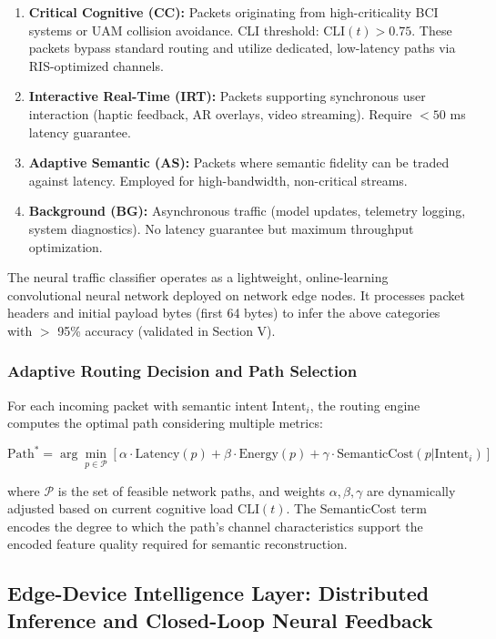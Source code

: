 \documentclass[journal]{IEEEtran}
\begin{document}
\begin{enumerate}
    \item \textbf{Critical Cognitive (CC):} Packets originating from high-criticality BCI systems or UAM collision avoidance. CLI threshold: $\text{CLI}(t) > 0.75$. These packets bypass standard routing and utilize dedicated, low-latency paths via RIS-optimized channels.
    \item \textbf{Interactive Real-Time (IRT):} Packets supporting synchronous user interaction (haptic feedback, AR overlays, video streaming). Require $<50$ ms latency guarantee.
    \item \textbf{Adaptive Semantic (AS):} Packets where semantic fidelity can be traded against latency. Employed for high-bandwidth, non-critical streams.
    \item \textbf{Background (BG):} Asynchronous traffic (model updates, telemetry logging, system diagnostics). No latency guarantee but maximum throughput optimization.
\end{enumerate}

The neural traffic classifier operates as a lightweight, online-learning convolutional neural network deployed on network edge nodes. It processes packet headers and initial payload bytes (first 64 bytes) to infer the above categories with $>$ 95\% accuracy (validated in Section V).

\subsubsection{Adaptive Routing Decision and Path Selection}
For each incoming packet with semantic intent $\text{Intent}_i$, the routing engine computes the optimal path considering multiple metrics:

\begin{equation}
    \text{Path}^* = \arg\min_{p \in \mathcal{P}} \left[ \alpha \cdot \text{Latency}(p) + \beta \cdot \text{Energy}(p) + \gamma \cdot \text{SemanticCost}(p | \text{Intent}_i) \right]
\end{equation}

where $\mathcal{P}$ is the set of feasible network paths, and weights $\alpha, \beta, \gamma$ are dynamically adjusted based on current cognitive load $\text{CLI}(t)$. The SemanticCost term encodes the degree to which the path's channel characteristics support the encoded feature quality required for semantic reconstruction.

\subsection{Edge-Device Intelligence Layer: Distributed Inference and Closed-Loop Neural Feedback}
\end{document}
